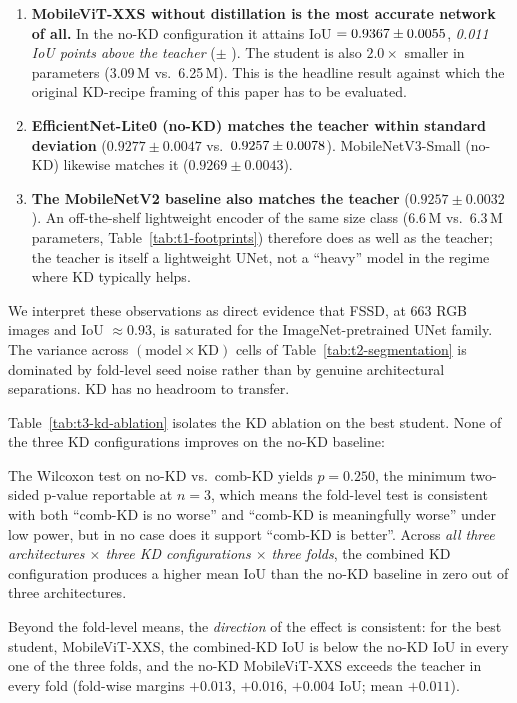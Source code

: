 \begin{enumerate}
\item \textbf{MobileViT-XXS without distillation is the most accurate network of all.} In the no-KD configuration it attains IoU $= 0.9367 \pm 0.0055$, \emph{0.011 IoU points above the teacher} (\teacherIoU $\pm$ \teacherStd). The student is also $2.0\times$ smaller in parameters (3.09\,M vs.~6.25\,M). This is the headline result against which the original KD-recipe framing of this paper has to be evaluated.
\item \textbf{EfficientNet-Lite0 (no-KD) matches the teacher within standard deviation} ($0.9277 \pm 0.0047$ vs.~$0.9257 \pm 0.0078$). MobileNetV3-Small (no-KD) likewise matches it ($0.9269 \pm 0.0043$).
\item \textbf{The MobileNetV2 baseline also matches the teacher} ($0.9257 \pm 0.0032$). An off-the-shelf lightweight encoder of the same size class (6.6\,M vs.\ 6.3\,M parameters, Table~\ref{tab:t1-footprints}) therefore does as well as the teacher; the teacher is itself a lightweight UNet, not a ``heavy'' model in the regime where KD typically helps.
\end{enumerate}

We interpret these observations as direct evidence that FSSD, at 663 RGB images and IoU $\approx 0.93$, is saturated for the ImageNet-pretrained UNet family. The variance across $(\text{model} \times \text{KD})$ cells of Table~\ref{tab:t2-segmentation} is dominated by fold-level seed noise rather than by genuine architectural separations. KD has no headroom to transfer.

Table~\ref{tab:t3-kd-ablation} isolates the KD ablation on the best student. None of the three KD configurations improves on the no-KD baseline:



The Wilcoxon test on no-KD vs.~comb-KD yields $p = 0.250$, the minimum two-sided p-value reportable at $n=3$, which means the fold-level test is consistent with both ``comb-KD is no worse'' and ``comb-KD is meaningfully worse'' under low power, but in no case does it support ``comb-KD is better''. Across \emph{all three architectures $\times$ three KD configurations $\times$ three folds}, the combined KD configuration produces a higher mean IoU than the no-KD baseline in zero out of three architectures.

Beyond the fold-level means, the \emph{direction} of the effect is consistent: for the best student, MobileViT-XXS, the combined-KD IoU is below the no-KD IoU in every one of the three folds, and the no-KD MobileViT-XXS exceeds the teacher in every fold (fold-wise margins $+0.013$, $+0.016$, $+0.004$ IoU; mean $+0.011$).

